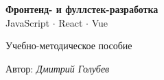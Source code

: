 
\begin{titlepage}
  \centering
  \vspace*{3cm}

  {\Huge\bfseries Фронтенд- и фуллстек-разработка\\[0.4em]}
  {\LARGE JavaScript \(\cdot\) React \(\cdot\) Vue\\[2cm]}

  {\Large Учебно-методическое пособие\\[3cm]}

  {\large Автор: \textit{Дмитрий Голубев}\\[0.5em]}

  \vfill

  {\large\the\year}
\end{titlepage}

